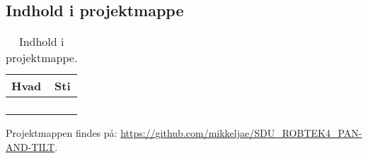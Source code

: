 
\subsection*{Indhold i projektmappe}
\begin{table}[th!]
\centering
\begin{tabular}{l|l}
Hvad&Sti\\\hline
&\\
&\\
&\\
&\\
\end{tabular}
\caption*{Indhold i projektmappe. \label{tb:CD}}
\end{table}

Projektmappen findes på:  \url{https://github.com/mikkeljae/SDU_ROBTEK4_PAN-AND-TILT}.
\clearpage
